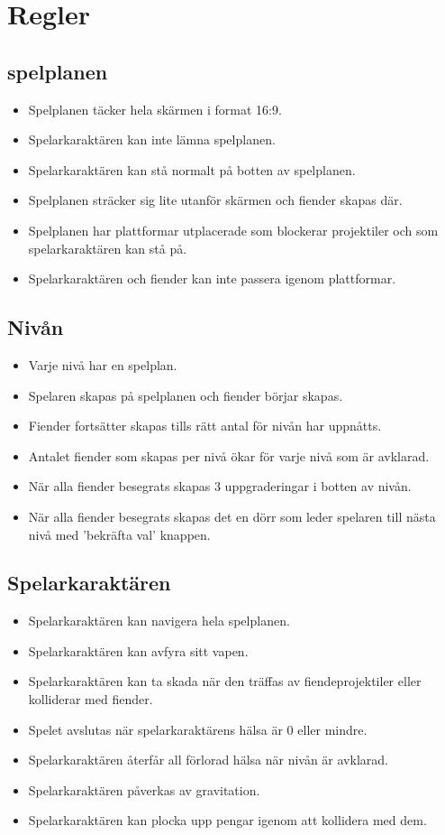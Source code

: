 \documentclass{TDP005mall}
\begin{document}
\section{Regler}
\subsection{spelplanen}
\begin{itemize}
\item Spelplanen täcker hela skärmen i format 16:9.
\item Spelarkaraktären kan inte lämna spelplanen.
\item Spelarkaraktären kan stå normalt på botten av spelplanen.
\item Spelplanen sträcker sig lite utanför skärmen och fiender skapas där.
\item Spelplanen har plattformar utplacerade som blockerar projektiler och som spelarkaraktären kan stå på.
\item Spelarkaraktären och fiender kan inte passera igenom plattformar.
\end{itemize}

\subsection{Nivån}
\begin{itemize}
\item Varje nivå har en spelplan.
\item Spelaren skapas på spelplanen och fiender börjar skapas.
\item Fiender fortsätter skapas tills rätt antal för nivån har uppnåtts.
\item Antalet fiender som skapas per nivå ökar för varje nivå som är avklarad.
\item När alla fiender besegrats skapas 3 uppgraderingar i botten av nivån.
\item När alla fiender besegrats skapas det en dörr som leder spelaren till nästa nivå med 'bekräfta val' knappen.
\end{itemize}

\subsection{Spelarkaraktären}
\begin{itemize}
\item Spelarkaraktären kan navigera hela spelplanen.
\item Spelarkaraktären kan avfyra sitt vapen.
\item Spelarkaraktären kan ta skada när den träffas av fiendeprojektiler eller kolliderar med fiender.
\item Spelet avslutas när spelarkaraktärens hälsa är 0 eller mindre.
\item Spelarkaraktären återfår all förlorad hälsa när nivån är avklarad.
\item Spelarkaraktären påverkas av gravitation.
\item Spelarkaraktären kan plocka upp pengar igenom att kollidera med dem.
\end{itemize}
\end{document}
